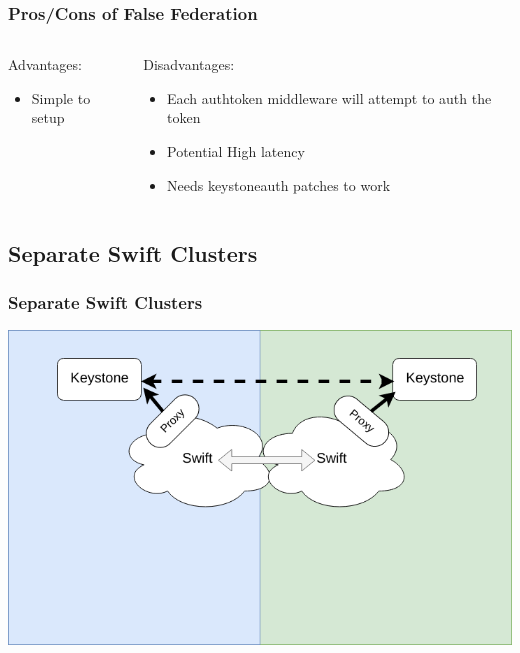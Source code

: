 \documentclass[aspectratio=169,11pt,hyperref={colorlinks=true}]{beamer}
\begin{document}
\begin{frame}
\frametitle{Pros/Cons of False Federation}
\begin{columns}[T]
    \begin{column}{.48\textwidth}
        Advantages:
        \begin{itemize}
            \item Simple to setup
        \end{itemize}
    \end{column}
    \begin{column}{.48\textwidth}
        Disadvantages:
        \begin{itemize}
            \item Each authtoken middleware will attempt to auth the token
            \item Potential High latency
            \item Needs keystoneauth patches to work
        \end{itemize}
    \end{column}
\end{columns}
\end{frame}

\subsection{Separate Swift Clusters}
\begin{frame}
\frametitle{Separate Swift Clusters}
\centering
\includegraphics[width=.775\textwidth]{swift-federation-sep-container-sync.png}
\end{frame}
\end{document}
